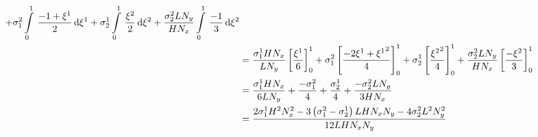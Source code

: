 \begin{equation}
\begin{aligned}
    +\conductivitytensorsymbol^{2}_{1}\gint{0}{1}{\dfrac{-1+\xione}{2}}{\xione}
    +\conductivitytensorsymbol^{1}_{2}\gint{0}{1}{\dfrac{\xitwo}{2}}{\xitwo}
    +\dfrac{\conductivitytensorsymbol^{2}_{2} L N_{y}}{H N_{x}}\gint{0}{1}{\dfrac{-1}{3}}{\xitwo} \\
    &=\dfrac{\conductivitytensorsymbol^{1}_{1} H N_{x}}{L N_{y}}\sqbrac{\dfrac{\xione}{6}}^{1}_{0}
    +\conductivitytensorsymbol^{2}_{1}\sqbrac{\dfrac{-2\xione+\xionesq}{4}}^{1}_{0}
    +\conductivitytensorsymbol^{1}_{2}\sqbrac{\dfrac{\xitwosq}{4}}^{1}_{0}
    +\dfrac{\conductivitytensorsymbol^{2}_{2} L N_{y}}{H N_{x}}\sqbrac{\dfrac{-\xitwo}{3}}^{1}_{0} \\
    &=\dfrac{\conductivitytensorsymbol^{1}_{1} H N_{x}}{6 L N_{y}}+\dfrac{-\conductivitytensorsymbol^{2}_{1}}{4}+
    \dfrac{\conductivitytensorsymbol^{1}_{2}}{4}+\dfrac{-\conductivitytensorsymbol^{2}_{2} L N_{y}}{3 H N_{x}} \\
    &=\dfrac{2\conductivitytensorsymbol^{1}_{1}H^{2}N_{x}^{2}-3\pbrac{\conductivitytensorsymbol^{2}_{1}-
        \conductivitytensorsymbol^{1}_{2}}L H N_{x} N_{y}-4\conductivitytensorsymbol^{2}_{2}L^{2}N_{y}^{2}}{12 L H N_{x} N_{y}}
  \end{aligned}
\end{equation}

